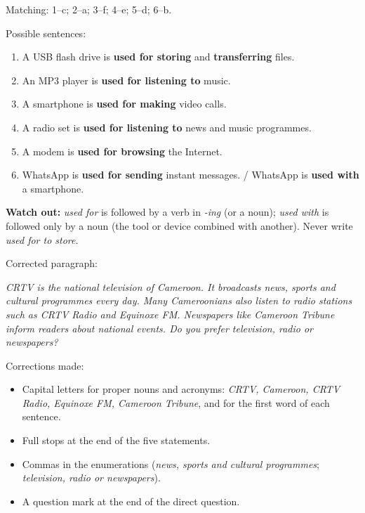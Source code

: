 \documentclass[11pt]{article}
\begin{document}
\begin{corrige}
Matching: 1--c; 2--a; 3--f; 4--e; 5--d; 6--b.

Possible sentences:
\begin{enumerate}
\item A USB flash drive is \textbf{used for storing} and \textbf{transferring} files.
\item An MP3 player is \textbf{used for listening to} music.
\item A smartphone is \textbf{used for making} video calls.
\item A radio set is \textbf{used for listening to} news and music programmes.
\item A modem is \textbf{used for browsing} the Internet.
\item WhatsApp is \textbf{used for sending} instant messages. / WhatsApp is \textbf{used with} a smartphone.
\end{enumerate}
\textbf{Watch out:} \emph{used for} is followed by a verb in \emph{-ing} (or a noun); \emph{used with} is followed only by a noun (the tool or device combined with another). Never write \emph{used for to store}.
\end{corrige}

\begin{corrige}
Corrected paragraph:

\emph{CRTV is the national television of Cameroon. It broadcasts news, sports and cultural programmes every day. Many Cameroonians also listen to radio stations such as CRTV Radio and Equinoxe FM. Newspapers like Cameroon Tribune inform readers about national events. Do you prefer television, radio or newspapers?}

Corrections made:
\begin{itemize}
\item Capital letters for proper nouns and acronyms: \emph{CRTV, Cameroon, CRTV Radio, Equinoxe FM, Cameroon Tribune}, and for the first word of each sentence.
\item Full stops at the end of the five statements.
\item Commas in the enumerations (\emph{news, sports and cultural programmes}; \emph{television, radio or newspapers}).
\item A question mark at the end of the direct question.
\end{itemize}
\end{corrige}
\end{document}
